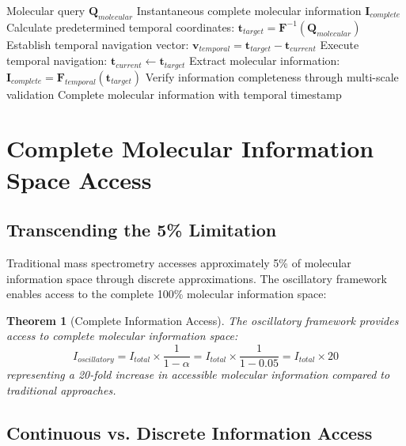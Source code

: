 \documentclass[12pt,a4paper]{article}
\newtheorem{theorem}{Theorem}[section]
\begin{document}
\begin{algorithm}
\caption{Temporal Molecular Information Navigation}
\begin{algorithmic}[1]
\REQUIRE Molecular query $\mathbf{Q}_{molecular}$
\ENSURE Instantaneous complete molecular information $\mathbf{I}_{complete}$
\STATE Calculate predetermined temporal coordinates: $\mathbf{t}_{target} = \mathbf{F}^{-1}(\mathbf{Q}_{molecular})$
\STATE Establish temporal navigation vector: $\mathbf{v}_{temporal} = \mathbf{t}_{target} - \mathbf{t}_{current}$
\STATE Execute temporal navigation: $\mathbf{t}_{current} \leftarrow \mathbf{t}_{target}$
\STATE Extract molecular information: $\mathbf{I}_{complete} = \mathbf{F}_{temporal}(\mathbf{t}_{target})$
\STATE Verify information completeness through multi-scale validation
\RETURN Complete molecular information with temporal timestamp
\end{algorithmic}
\end{algorithm}

\section{Complete Molecular Information Space Access}

\subsection{Transcending the 5\% Limitation}

Traditional mass spectrometry accesses approximately 5\% of molecular information space through discrete approximations. The oscillatory framework enables access to the complete 100\% molecular information space:

\begin{theorem}[Complete Information Access]
The oscillatory framework provides access to complete molecular information space:
\begin{equation}
I_{oscillatory} = I_{total} \times \frac{1}{1-\alpha} = I_{total} \times \frac{1}{1-0.05} = I_{total} \times 20
\end{equation}
representing a 20-fold increase in accessible molecular information compared to traditional approaches.
\end{theorem}

\subsection{Continuous vs. Discrete Information Access}
\end{document}
